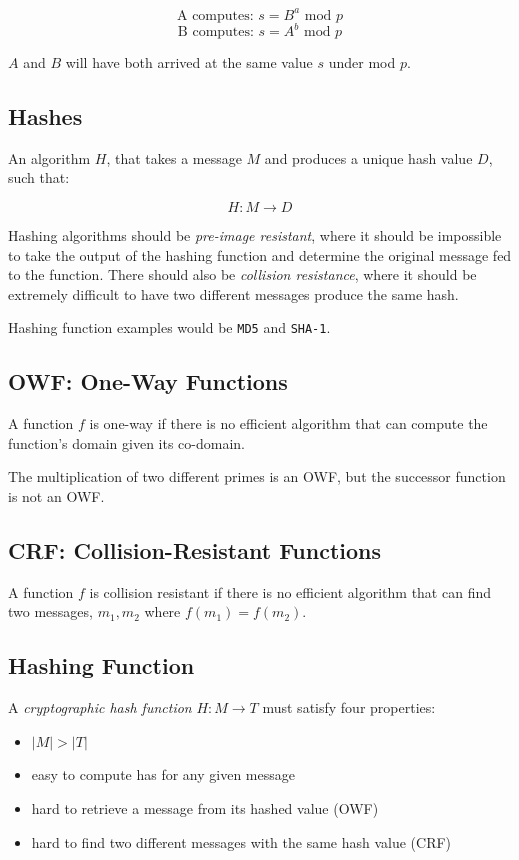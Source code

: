 \documentclass{article}
\begin{document}
\[ \text{A computes: } s = B^a \text{ mod } p \]
\[ \text{B computes: } s = A^b \text{ mod } p \]

$A$ and $B$ will have both arrived at the same value $s$ under mod $p$.

\subsection{Hashes}

An algorithm $H$, that takes a message $M$ and produces a unique hash value $D$, such that:

\[ H : M \rightarrow D\]

Hashing algorithms should be \textit{pre-image resistant}, where it should be impossible to take the output of the hashing function and determine the original message fed to the function. There should also be \textit{collision resistance}, where it should be extremely difficult to have two different messages produce the same hash.

Hashing function examples would be \texttt{MD5} and \texttt{SHA-1}.

\subsection{OWF: One-Way Functions}

A function $f$ is one-way if there is no efficient algorithm that can compute the function's domain given its co-domain.

The multiplication of two different primes is an OWF, but the successor function is not an OWF.

\subsection{CRF: Collision-Resistant Functions}

A function $f$ is collision resistant if there is no efficient algorithm that can find two messages, $m_1, m_2$ where $f(m_1) = f(m_2)$.

\subsection{Hashing Function}

A \textit{cryptographic hash function} $H : M \rightarrow T$ must satisfy four properties:

\begin{itemize}
\item
  $|M| > |T|$
\item
  easy to compute has for any given message
\item
  hard to retrieve a message from its hashed value (OWF)
\item
  hard to find two different messages with the same hash value (CRF)  
\end{itemize}
\end{document}
